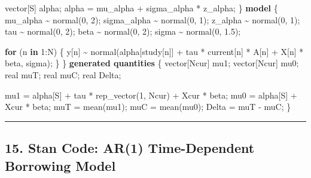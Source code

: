 \documentclass[
  letterpaper,
  DIV=11,
  numbers=noendperiod]{scrartcl}
\newenvironment{Shaded}{\begin{snugshade}}{\end{snugshade}}
\newcommand{\ControlFlowTok}[1]{\textcolor[rgb]{0.00,0.23,0.31}{\textbf{#1}}}
\newcommand{\DataTypeTok}[1]{\textcolor[rgb]{0.68,0.00,0.00}{#1}}
\newcommand{\DecValTok}[1]{\textcolor[rgb]{0.68,0.00,0.00}{#1}}
\newcommand{\FloatTok}[1]{\textcolor[rgb]{0.68,0.00,0.00}{#1}}
\newcommand{\KeywordTok}[1]{\textcolor[rgb]{0.00,0.23,0.31}{\textbf{#1}}}
\newcommand{\NormalTok}[1]{\textcolor[rgb]{0.00,0.23,0.31}{#1}}
\begin{document}
\begin{Shaded}
\begin{Highlighting}[]
  \DataTypeTok{vector}\NormalTok{[S] alpha;}
\NormalTok{  alpha = mu\_alpha + sigma\_alpha * z\_alpha;}
\NormalTok{\}}
\KeywordTok{model}\NormalTok{ \{}
\NormalTok{  mu\_alpha    \textasciitilde{} normal(}\DecValTok{0}\NormalTok{, }\DecValTok{2}\NormalTok{);}
\NormalTok{  sigma\_alpha \textasciitilde{} normal(}\DecValTok{0}\NormalTok{, }\DecValTok{1}\NormalTok{);}
\NormalTok{  z\_alpha     \textasciitilde{} normal(}\DecValTok{0}\NormalTok{, }\DecValTok{1}\NormalTok{);}
\NormalTok{  tau         \textasciitilde{} normal(}\DecValTok{0}\NormalTok{, }\DecValTok{2}\NormalTok{);}
\NormalTok{  beta        \textasciitilde{} normal(}\DecValTok{0}\NormalTok{, }\DecValTok{2}\NormalTok{);}
\NormalTok{  sigma       \textasciitilde{} normal(}\DecValTok{0}\NormalTok{, }\FloatTok{1.5}\NormalTok{);}

  \ControlFlowTok{for}\NormalTok{ (n }\ControlFlowTok{in} \DecValTok{1}\NormalTok{:N) \{}
\NormalTok{    y[n] \textasciitilde{} normal(alpha[study[n]] + tau * current[n] * A[n] + X[n] * beta, sigma);}
\NormalTok{  \}}
\NormalTok{\}}
\KeywordTok{generated quantities}\NormalTok{ \{}
  \DataTypeTok{vector}\NormalTok{[Ncur] mu1;}
  \DataTypeTok{vector}\NormalTok{[Ncur] mu0;}
  \DataTypeTok{real}\NormalTok{ muT;}
  \DataTypeTok{real}\NormalTok{ muC;}
  \DataTypeTok{real}\NormalTok{ Delta;}

\NormalTok{  mu1 = alpha[S] + tau * rep\_vector(}\DecValTok{1}\NormalTok{, Ncur) + Xcur * beta;}
\NormalTok{  mu0 = alpha[S] + Xcur * beta;}
\NormalTok{  muT = mean(mu1);}
\NormalTok{  muC = mean(mu0);}
\NormalTok{  Delta = muT {-} muC;}
\NormalTok{\}}
\end{Highlighting}
\end{Shaded}

\begin{center}\rule{0.5\linewidth}{0.5pt}\end{center}

\subsection{15. Stan Code: AR(1) Time-Dependent Borrowing
Model}\label{stan-code-ar1-time-dependent-borrowing-model}
\end{document}
